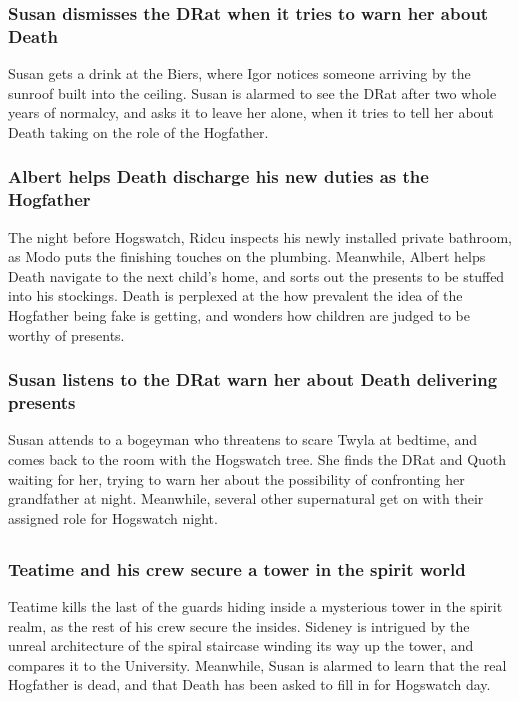 \subsubsection{\Gls{Susan} dismisses the \Gls{DRat} when it tries to warn her about \Gls{Death}}
\Gls{Susan} gets a drink at the Biers, where \Gls{Igor} notices someone arriving by the sunroof
built into the ceiling. \Gls{Susan} is alarmed to see the \Gls{DRat} after two whole years of
normalcy, and asks it to leave her alone, when it tries to tell her about \Gls{Death} taking on
the role of the Hogfather.

\subsubsection{\Gls{Albert} helps \Gls{Death} discharge his new duties as the Hogfather}
The night before Hogswatch, \Gls{Ridcu} inspects his newly installed private bathroom, as \Gls{Modo}
puts the finishing touches on the plumbing. Meanwhile, \Gls{Albert} helps \Gls{Death} navigate to
the next child's home, and sorts out the presents to be stuffed into his stockings. \Gls{Death} is
perplexed at the how prevalent the idea of the Hogfather being fake is getting, and wonders how
children are judged to be worthy of presents.

\subsubsection{\Gls{Susan} listens to the \Gls{DRat} warn her about \Gls{Death} delivering presents}
\Gls{Susan} attends to a bogeyman who threatens to scare \Gls{Twyla} at bedtime, and comes back
to the room with the Hogswatch tree. She finds the \Gls{DRat} and \Gls{Quoth} waiting for her,
trying to warn her about the possibility of confronting her grandfather at night. Meanwhile, several
other supernatural get on with their assigned role for Hogswatch night.

\subsection{}
\subsubsection{\Gls{Teatime} and his crew secure a tower in the spirit world}
\Gls{Teatime} kills the last of the guards hiding inside a mysterious tower in the spirit realm,
as the rest of his crew secure the insides. \Gls{Sideney} is intrigued by the unreal architecture
of the spiral staircase winding its way up the tower, and compares it to the University. Meanwhile,
\Gls{Susan} is alarmed to learn that the real Hogfather is dead, and that \Gls{Death} has been
asked to fill in for Hogswatch day.

